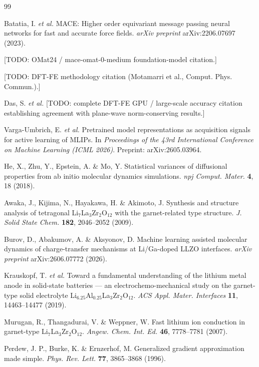 \documentclass[11pt]{article}
\begin{document}
\begin{thebibliography}{99}

Batatia, I. \emph{et al.} MACE: Higher order equivariant message passing
neural networks for fast and accurate force fields. \emph{arXiv preprint}
arXiv:2206.07697 (2023).

[TODO: OMat24 / mace-omat-0-medium foundation-model citation.]

[TODO: DFT-FE methodology citation (Motamarri et al., Comput. Phys. Commun.).]

Das, S. \emph{et al.} [TODO: complete DFT-FE GPU / large-scale accuracy
citation establishing agreement with plane-wave norm-conserving results.]

Varga-Umbrich, E. \emph{et al.} Pretrained model representations as acquisition signals
for active learning of MLIPs. In \emph{Proceedings of the 43rd International
Conference on Machine Learning (ICML 2026)}. Preprint: arXiv:2605.03964.

He, X., Zhu, Y., Epstein, A. \& Mo, Y. Statistical variances of diffusional
properties from ab initio molecular dynamics simulations. \emph{npj Comput.
Mater.} \textbf{4}, 18 (2018).

Awaka, J., Kijima, N., Hayakawa, H. \& Akimoto, J. Synthesis and structure
analysis of tetragonal Li$_7$La$_3$Zr$_2$O$_{12}$ with the garnet-related type
structure. \emph{J. Solid State Chem.} \textbf{182}, 2046--2052 (2009).

Burov, D., Abakumov, A. \& Aksyonov, D. Machine learning assisted molecular
dynamics of charge-transfer mechanisms at Li/Ga-doped LLZO interfaces.
\emph{arXiv preprint} arXiv:2606.07772 (2026).

Krauskopf, T. \emph{et al.} Toward a fundamental understanding of the lithium
metal anode in solid-state batteries --- an electrochemo-mechanical study on
the garnet-type solid electrolyte Li$_{6.25}$Al$_{0.25}$La$_3$Zr$_2$O$_{12}$.
\emph{ACS Appl. Mater. Interfaces} \textbf{11}, 14463--14477 (2019).

Murugan, R., Thangadurai, V. \& Weppner, W. Fast lithium ion conduction in
garnet-type Li$_7$La$_3$Zr$_2$O$_{12}$. \emph{Angew. Chem. Int. Ed.}
\textbf{46}, 7778--7781 (2007).

Perdew, J. P., Burke, K. \& Ernzerhof, M. Generalized gradient approximation
made simple. \emph{Phys. Rev. Lett.} \textbf{77}, 3865--3868 (1996).


\end{thebibliography}
\end{document}
